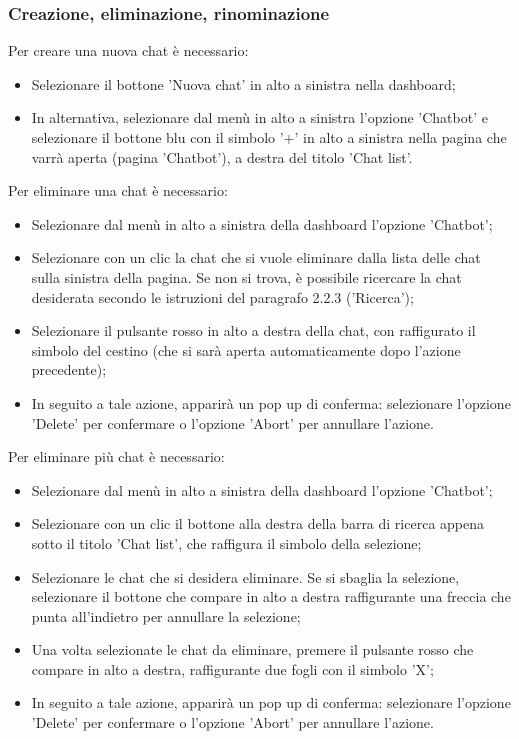 \documentclass[10pt, a4paper]{article}
\begin{document}
\subsubsection{Creazione, eliminazione, rinominazione}
Per creare una nuova chat è necessario:
\begin{itemize}
    \item Selezionare il bottone 'Nuova chat' in alto a sinistra nella dashboard;
    \item In alternativa, selezionare dal menù in alto a sinistra l'opzione 'Chatbot' e selezionare il bottone blu con il simbolo '+' in alto a sinistra nella pagina che varrà aperta (pagina 'Chatbot'), a destra del titolo 'Chat list'.
\end{itemize}
Per eliminare una chat è necessario:
\begin{itemize}
    \item Selezionare dal menù in alto a sinistra della dashboard l'opzione 'Chatbot';
    \item Selezionare con un clic la chat che si vuole eliminare dalla lista delle chat sulla sinistra della pagina. Se non si trova, è possibile ricercare la chat desiderata secondo le istruzioni del paragrafo 2.2.3 ('Ricerca');
    \item Selezionare il pulsante rosso in alto a destra della chat, con raffigurato il simbolo del cestino (che si sarà aperta automaticamente dopo l'azione precedente);
    \item In seguito a tale azione, apparirà un pop up di conferma: selezionare l'opzione 'Delete' per confermare o l'opzione 'Abort' per annullare l'azione.
\end{itemize}
Per eliminare più chat è necessario:
\begin{itemize}
    \item Selezionare dal menù in alto a sinistra della dashboard l'opzione 'Chatbot';
    \item Selezionare con un clic il bottone alla destra della barra di ricerca appena sotto il titolo 'Chat list', che raffigura il simbolo della selezione;
    \item Selezionare le chat che si desidera eliminare. Se si sbaglia la selezione, selezionare il bottone che compare in alto a destra raffigurante una freccia che punta all'indietro per annullare la selezione;
    \item Una volta selezionate le chat da eliminare, premere il pulsante rosso che compare in alto a destra, raffigurante due fogli con il simbolo 'X';
    \item In seguito a tale azione, apparirà un pop up di conferma: selezionare l'opzione 'Delete' per confermare o l'opzione 'Abort' per annullare l'azione.
\end{itemize}
\end{document}

